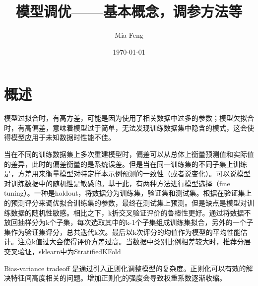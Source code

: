 \documentclass{ctexart}
\title{模型调优——基本概念，调参方法等} %
\author{Mia Feng} %
\date{\today} %
\begin{document}
\maketitle %




\section{概述}
模型过拟合时，有高方差，可能是因为使用了相关数据中过多的参数；模型欠拟合时，有高偏差，意味着模型过于简单，无法发现训练数据集中隐含的模式，这会使得模型应用于未知数据时性能不佳。

当在不同的训练数据集上多次重建模型时，偏差可以从总体上衡量预测值和实际值的差异，此时的偏差衡量的是系统误差。但是当在同一训练集的不同子集上训练是，方差用来衡量模型对特定样本示例预测的一致性（或者说变化）。可以说模型对训练数据中的随机性是敏感的。基于此，有两种方法进行模型选择（fine tuning）。一种是holdout，将数据分为训练集，验证集和测试集。根据在验证集上的预测评分来调优拟合训练集的参数，最终在测试集上预测。但是缺点是模型对训练数据的随机性敏感。相比之下，k折交叉验证评价的鲁棒性更好。通过将数据不放回抽样分为k个子集，每次选取其中的k-1个子集组成训练集拟合，另外的一个子集作为验证集评分，总共迭代k次。最后以k次评分的均值作为模型的平均性能估计。注意k值过大会使得评价方差过高。当数据中类别比例相差较大时，推荐分层交叉验证，sklearn中为StratifiedKFold

Bias-variance tradeoff 是通过引入正则化调整模型的复杂度。正则化可以有效的解决特征间高度相关的问题。增加正则化的强度会导致权重系数逐渐收缩。
\end{document}
